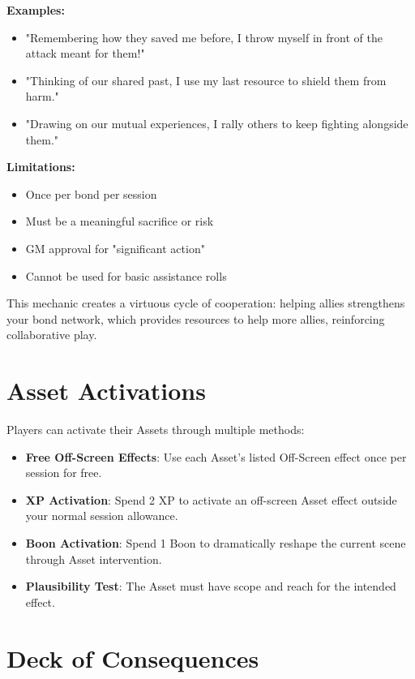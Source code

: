 \textbf{Examples:}
\begin{itemize}
    \item "Remembering how they saved me before, I throw myself in front of the attack meant for them!"
    \item "Thinking of our shared past, I use my last resource to shield them from harm."
    \item "Drawing on our mutual experiences, I rally others to keep fighting alongside them."
\end{itemize}

\textbf{Limitations:}
\begin{itemize}
    \item Once per bond per session
    \item Must be a meaningful sacrifice or risk
    \item GM approval for "significant action"
    \item Cannot be used for basic assistance rolls
\end{itemize}

This mechanic creates a virtuous cycle of cooperation: helping allies strengthens your bond network, which provides resources to help more allies, reinforcing collaborative play.

\section{Asset Activations}

Players can activate their Assets through multiple methods:

\begin{itemize}
    \item \textbf{Free Off-Screen Effects}: Use each Asset's listed Off-Screen effect once per session for free.
    \item \textbf{XP Activation}: Spend 2 XP to activate an off-screen Asset effect outside your normal session allowance.
    \item \textbf{Boon Activation}: Spend 1 Boon to dramatically reshape the current scene through Asset intervention.
    \item \textbf{Plausibility Test}: The Asset must have scope and reach for the intended effect.
\end{itemize}

\section{Deck of Consequences}

